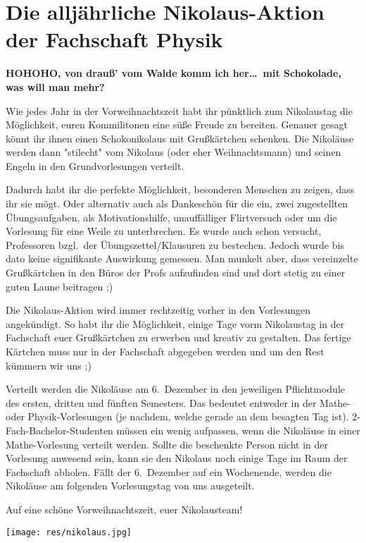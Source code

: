 \section{Die alljährliche Nikolaus-Aktion der Fachschaft Physik}
\begin{multicols}{2}
\textbf{HOHOHO, von drauß' vom Walde komm ich her\dots\
	mit Schokolade, was will man mehr?}

Wie jedes Jahr in der Vorweihnachtszeit habt ihr pünktlich zum Nikolaustag die Möglichkeit, euren Kommilitonen eine süße Freude zu bereiten. Genauer gesagt könnt ihr ihnen einen Schokonikolaus mit Grußkärtchen schenken. 
Die Nikoläuse werden dann "stilecht" vom Nikolaus (oder eher Weihnachtsmann) und seinen Engeln in den Grundvorlesungen verteilt.

Dadurch habt ihr die perfekte Möglichkeit, besonderen Menschen zu zeigen, dass ihr sie mögt. Oder alternativ auch als Dankeschön für die ein, zwei  zugestellten Übungsaufgaben, als Motivationshilfe, 
unauffälliger Flirtversuch oder um die Vorlesung für eine Weile zu unterbrechen. Es wurde auch schon versucht, Professoren bzgl.\ der Übungszettel/Klausuren zu bestechen. 
Jedoch wurde bis dato keine signifikante Auswirkung gemessen. Man munkelt aber, dass vereinzelte Grußkärtchen in den Büros der Profs aufzufinden sind und dort stetig zu einer guten Laune beitragen ;)

Die Nikolaus-Aktion wird immer rechtzeitig vorher in den Vorlesungen angekündigt. So habt ihr die Möglichkeit, einige Tage vorm Nikolaustag in der Fachschaft euer Grußkärtchen zu erwerben und kreativ zu gestalten. 
Das fertige Kärtchen muss nur in der Fachschaft abgegeben werden und um den Rest kümmern wir uns ;)

Verteilt werden die Nikoläuse am 6.~Dezember in den jeweiligen Pflichtmodule des ersten, dritten und fünften Semesters. Das bedeutet entweder in der Mathe- oder Physik-Vorlesungen (je nachdem, welche gerade an dem besagten Tag ist).
2-Fach-Bachelor-Studenten müssen ein wenig aufpassen, wenn die Nikoläuse in einer Mathe-Vorlesung verteilt werden.
Sollte die beschenkte Person nicht in der Vorlesung anwesend sein, kann sie den Nikolaus noch einige Tage im Raum der Fachschaft abholen.
Fällt der 6.~Dezember auf ein Wochenende, werden die Nikoläuse am folgenden Vorlesungstag von uns ausgeteilt.

Auf eine schöne Vorweihnachtszeit, euer Nikolausteam!

\end{multicols}

\vspace{\fill}
\begin{center}
	\texttt{[image: res/nikolaus.jpg]}
\end{center}
